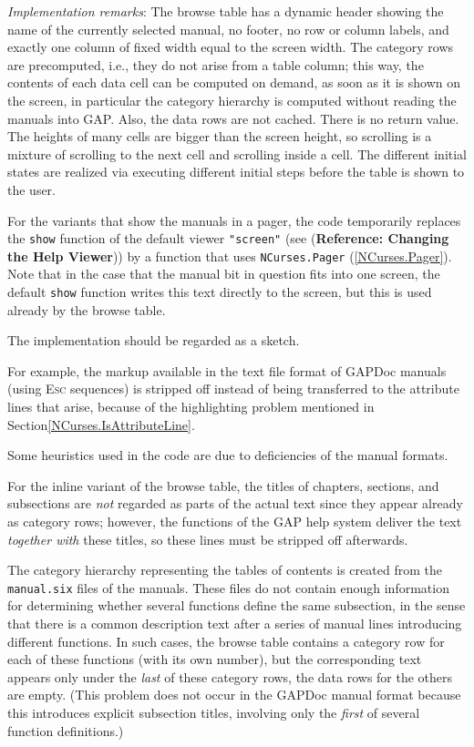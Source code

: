 \documentclass[a4paper,11pt]{report}
\begin{document}
{{{ \emph{Implementation remarks}: The browse table has a dynamic header showing the name of the currently
selected manual, no footer, no row or column labels, and exactly one column of
fixed width equal to the screen width. The category rows are precomputed,
i.{\nobreakspace}e., they do not arise from a table column; this way, the
contents of each data cell can be computed on demand, as soon as it is shown
on the screen, in particular the category hierarchy is computed without
reading the manuals into \textsf{GAP}. Also, the data rows are not cached. There is no return value. The heights of
many cells are bigger than the screen height, so scrolling is a mixture of
scrolling to the next cell and scrolling inside a cell. The different initial
states are realized via executing different initial steps before the table is
shown to the user. 

 For the variants that show the manuals in a pager, the code temporarily
replaces the \texttt{show} function of the default viewer \texttt{"screen"} (see  (\textbf{Reference: Changing the Help Viewer})) by a function that uses \texttt{NCurses.Pager} (\ref{NCurses.Pager}). Note that in the case that the manual bit in question fits into one screen,
the default \texttt{show} function writes this text directly to the screen, but this is used already by
the browse table. 

 The implementation should be regarded as a sketch. 

 For example, the markup available in the text file format of \textsf{GAPDoc} manuals (using \textsc{Esc} sequences) is stripped off instead of being transferred to the attribute lines
that arise, because of the highlighting problem mentioned in
Section{\nobreakspace}\ref{NCurses.IsAttributeLine}. 

 Some heuristics used in the code are due to deficiencies of the manual
formats. 

 For the inline variant of the browse table, the titles of chapters, sections,
and subsections are \emph{not} regarded as parts of the actual text since they appear already as category
rows; however, the functions of the \textsf{GAP} help system deliver the text \emph{together with} these titles, so these lines must be stripped off afterwards. 

 The category hierarchy representing the tables of contents is created from the \texttt{manual.six} files of the manuals. These files do not contain enough information for
determining whether several functions define the same subsection, in the sense
that there is a common description text after a series of manual lines
introducing different functions. In such cases, the browse table contains a
category row for each of these functions (with its own number), but the
corresponding text appears only under the \emph{last} of these category rows, the data rows for the others are empty. (This problem
does not occur in the \textsf{GAPDoc} manual format because this introduces explicit subsection titles, involving
only the \emph{first} of several function definitions.) 

}}}
\end{document}
